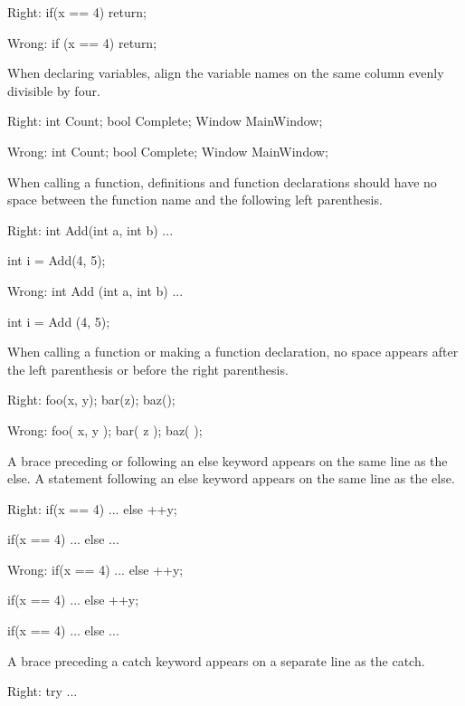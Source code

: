 Right:
\startCodeExample
if(x == 4)
    return;
\stopCodeExample

Wrong:
\startCodeExample
if (x == 4)
    return;
\stopCodeExample

\item
When declaring variables, align the variable names on the same column evenly divisible by four.

Right:
\startCodeExample
int     Count;
bool    Complete;
Window  MainWindow;
\stopCodeExample

Wrong:
\startCodeExample
int Count;
bool Complete;
Window MainWindow;
\stopCodeExample

\item
When calling a function, definitions and function declarations should have no space between the function name and the following left parenthesis.

Right:
\startCodeExample
int Add(int a, int b)
{ 
    ... 
}

int i = Add(4, 5);
\stopCodeExample

Wrong:
\startCodeExample
int Add (int a, int b)
{
    ...
}

int i = Add (4, 5);
\stopCodeExample

\item
When calling a function or making a function declaration, no space appears after the left parenthesis or before the right parenthesis.

Right:
\startCodeExample
foo(x, y);
bar(z);
baz();
\stopCodeExample

Wrong:
\startCodeExample
foo( x, y );
bar( z );
baz( );
\stopCodeExample

\item
A brace preceding or following an else keyword appears on the same line as the else. A statement following an else keyword appears on the same line as the else. 

Right:
\startCodeExample
if(x == 4)
{
    ...
}
else
  ++y;

if(x == 4)
{
    ...
}
else
{
    ...
}
\stopCodeExample

Wrong:
\startCodeExample
if(x == 4) {
    ...
}
else ++y;

if(x == 4) {
    ...
} else ++y;

if(x == 4) {
    ...
}
else {
    ...
}
\stopCodeExample

\item
A brace preceding a catch keyword appears on a separate line as the catch. 

Right:
\startCodeExample
try
{
    ...
}

